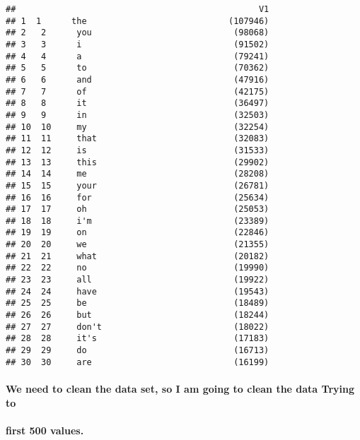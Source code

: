 \documentclass[
]{article}
\newenvironment{Shaded}{\begin{snugshade}}{\end{snugshade}}
\newcommand{\AttributeTok}[1]{\textcolor[rgb]{0.77,0.63,0.00}{#1}}
\newcommand{\ConstantTok}[1]{\textcolor[rgb]{0.00,0.00,0.00}{#1}}
\newcommand{\DecValTok}[1]{\textcolor[rgb]{0.00,0.00,0.81}{#1}}
\newcommand{\FunctionTok}[1]{\textcolor[rgb]{0.00,0.00,0.00}{#1}}
\newcommand{\NormalTok}[1]{#1}
\newcommand{\OtherTok}[1]{\textcolor[rgb]{0.56,0.35,0.01}{#1}}
\newcommand{\SpecialCharTok}[1]{\textcolor[rgb]{0.00,0.00,0.00}{#1}}
\begin{document}
\begin{verbatim}
##                                                V1
## 1  1      the                            (107946)
## 2   2      you                            (98068)
## 3   3      i                              (91502)
## 4   4      a                              (79241)
## 5   5      to                             (70362)
## 6   6      and                            (47916)
## 7   7      of                             (42175)
## 8   8      it                             (36497)
## 9   9      in                             (32503)
## 10  10     my                             (32254)
## 11  11     that                           (32083)
## 12  12     is                             (31533)
## 13  13     this                           (29902)
## 14  14     me                             (28208)
## 15  15     your                           (26781)
## 16  16     for                            (25634)
## 17  17     oh                             (25053)
## 18  18     i'm                            (23389)
## 19  19     on                             (22846)
## 20  20     we                             (21355)
## 21  21     what                           (20182)
## 22  22     no                             (19990)
## 23  23     all                            (19922)
## 24  24     have                           (19543)
## 25  25     be                             (18489)
## 26  26     but                            (18244)
## 27  27     don't                          (18022)
## 28  28     it's                           (17183)
## 29  29     do                             (16713)
## 30  30     are                            (16199)
\end{verbatim}

\hypertarget{we-need-to-clean-the-data-set-so-i-am-going-to-clean-the-data-trying-to}{%
\paragraph{We need to clean the data set, so I am going to clean the
data Trying
to}\label{we-need-to-clean-the-data-set-so-i-am-going-to-clean-the-data-trying-to}}

\hypertarget{first-500-values.}{%
\paragraph{first 500 values.}\label{first-500-values.}}

\begin{Shaded}
\end{Shaded}
\end{document}
